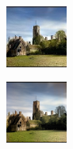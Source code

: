 \documentclass[10pt,twocolumn,letterpaper]{article}
\begin{document}
\begin{figure}[ht]
\begin{subfigure}[b]{0.1\textwidth}
	\end{subfigure}
	\hfill
	\begin{subfigure}[b]{0.1\textwidth}
		\includegraphics[width=2cm]{chr - imgnet2.jpeg}
	\end{subfigure}
	\hfill
	\begin{subfigure}[b]{0.1\textwidth}
		\includegraphics[width=2cm]{su - imgnet.png}
	\end{subfigure}
	

\end{figure}
\end{document}
